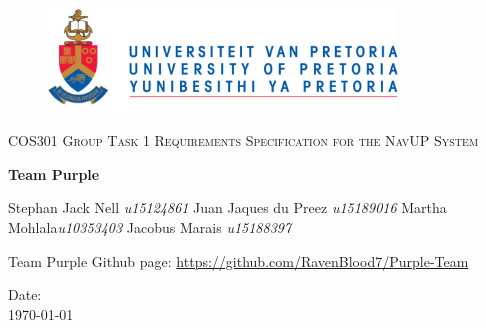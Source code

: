 \begin{titlepage}
	\begin{center}
		\begin{figure}[t]
			\centering
			\includegraphics[width=350px]{logo.PNG}
		\end{figure}
		
		\textsc{\LARGE COS301 Group Task 1 \newline\newline Requirements Specification for the NavUP System}
		
		\textbf{\newline Team Purple} \\
		\begin{flushright} \large
			Stephan Jack Nell \emph{u15124861} \newline
			Juan Jaques du Preez \emph{u15189016} \newline
			Martha Mohlala\emph{u10353403}\newline
			Jacobus Marais \emph{u15188397}\newline
		\end{flushright}

		\vfill %

		Team Purple Github page: \href{https://github.com/RavenBlood7/Purple-Team}
\url{https://github.com/RavenBlood7/Purple-Team}

		\vfill
{\large Date:}
\\
{\large \today}

	\end{center}
\end{titlepage}
